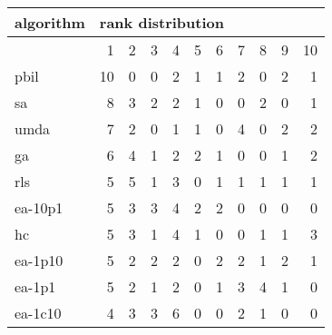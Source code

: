 \begin{tabular}{@{}l*{10}{r}@{}}
\toprule
algorithm & \multicolumn{10}{l}{{rank distribution}}\\
\midrule
& 1 & 2 & 3 & 4 & 5 & 6 & 7 & 8 & 9 & 10\\
\midrule
pbil & 10 & 0 & 0 & 2 & 1 & 1 & 2 & 0 & 2 & 1\\
sa & 8 & 3 & 2 & 2 & 1 & 0 & 0 & 2 & 0 & 1\\
umda & 7 & 2 & 0 & 1 & 1 & 0 & 4 & 0 & 2 & 2\\
ga & 6 & 4 & 1 & 2 & 2 & 1 & 0 & 0 & 1 & 2\\
rls & 5 & 5 & 1 & 3 & 0 & 1 & 1 & 1 & 1 & 1\\
ea-10p1 & 5 & 3 & 3 & 4 & 2 & 2 & 0 & 0 & 0 & 0\\
hc & 5 & 3 & 1 & 4 & 1 & 0 & 0 & 1 & 1 & 3\\
ea-1p10 & 5 & 2 & 2 & 2 & 0 & 2 & 2 & 1 & 2 & 1\\
ea-1p1 & 5 & 2 & 1 & 2 & 0 & 1 & 3 & 4 & 1 & 0\\
ea-1c10 & 4 & 3 & 3 & 6 & 0 & 0 & 2 & 1 & 0 & 0\\
\bottomrule
\end{tabular}
